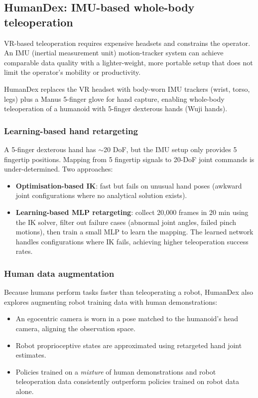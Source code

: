 \subsection{HumanDex: IMU-based whole-body teleoperation}

\begin{intuitionbox}
VR-based teleoperation requires expensive headsets and constrains the operator. An IMU (inertial measurement unit) motion-tracker system can achieve comparable data quality with a lighter-weight, more portable setup that does not limit the operator's mobility or productivity.
\end{intuitionbox}

HumanDex replaces the VR headset with body-worn IMU trackers (wrist, torso, legs) plus a Manus 5-finger glove for hand capture, enabling whole-body teleoperation of a humanoid with 5-finger dexterous hands (Wuji hands).

\subsubsection{Learning-based hand retargeting}

A 5-finger dexterous hand has $\sim$20 DoF, but the IMU setup only provides 5 fingertip positions. Mapping from 5 fingertip signals to 20-DoF joint commands is under-determined. Two approaches:
\begin{itemize}
  \item \textbf{Optimisation-based IK}: fast but fails on unusual hand poses (awkward joint configurations where no analytical solution exists).
  \item \textbf{Learning-based MLP retargeting}: collect 20{,}000 frames in 20 min using the IK solver, filter out failure cases (abnormal joint angles, failed pinch motions), then train a small MLP to learn the mapping. The learned network handles configurations where IK fails, achieving higher teleoperation success rates.
\end{itemize}

\subsubsection{Human data augmentation}

Because humans perform tasks faster than teleoperating a robot, HumanDex also explores augmenting robot training data with human demonstrations:
\begin{itemize}
  \item An egocentric camera is worn in a pose matched to the humanoid's head camera, aligning the observation space.
  \item Robot proprioceptive states are approximated using retargeted hand joint estimates.
  \item Policies trained on a \emph{mixture} of human demonstrations and robot teleoperation data consistently outperform policies trained on robot data alone.
\end{itemize}
